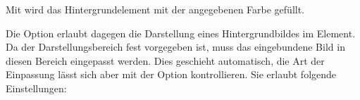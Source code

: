 \documentclass[a4paper,11pt]{tubsreprt}
\begin{document}
Mit  wird das Hintergrundelement mit der angegebenen
Farbe gefüllt.

Die Option  erlaubt dagegen die Darstellung
eines Hintergrundbildes im Element.
Da der Darstellungsbereich fest vorgegeben ist, muss das eingebundene Bild
in diesen Bereich eingepasst werden. Dies geschieht automatisch, die Art
der Einpassung lässt sich aber mit der Option  kontrollieren.
Sie erlaubt folgende Einstellungen:


\begin{desctable}
\end{desctable}




\end{document}
